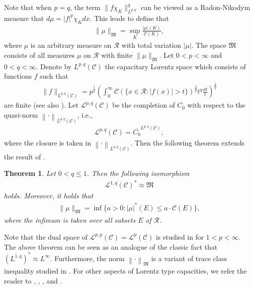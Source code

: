 \documentclass[10pt,reqno]{amsart}
\newtheorem{theorem}{Theorem}[section]
\numberwithin{equation}{section}
\begin{document}
Note that when $p=q$, the term $\|f\chi_{K}\|_{L^{p,q}}^{q}$ can be viewed as a Radon-Nikodym measure that $d\mu=|f|^{p}\chi_{K}dx$. This leads to define that
\begin{align*}
\|\mu\|_{\mathfrak{M}}=\sup_{K}\frac{|\mu|(K)}{\mathcal{C}(K)},
\end{align*}
where $\mu$ is an arbitrary measure on $\mathcal{R}$ with total variation $|\mu|$. The space $\mathfrak{M}$ consists of all measures $\mu$ on $\mathcal{R}$ with finite $\|\mu\|_{\mathfrak{M}}$. Let $0<p<\infty$ and $0<q<\infty$. Denote by $L^{p,q}(\mathcal{C})$ the capacitary Lorentz space which consists of functions $f$ such that
\begin{align*}
\|f\|_{L^{p,q}(\mathcal{C})}=p^{\frac{1}{q}}\left(\int_{0}^{\infty}\mathcal{C}(\{x\in\mathcal{R}:|f(x)|>t\})^{\frac{q}{p}}t^{q}\frac{dt}{t}\right)^{\frac{1}{q}}
\end{align*}
are finite (see also \cite{OK3}). Let $\mathcal{L}^{p,q}(\mathcal{C})$ be the completion of $C_{0}$ with respect to the quasi-norm $\left\|\cdot\right\|_{L^{p,q}(\mathcal{C})}$, i.e., 
\begin{align*}
\mathcal{L}^{p,q}(\mathcal{C})=\overline{C_{0}}^{L^{p,q}(\mathcal{C})},
\end{align*}
where the closure is taken in $\left\|\cdot\right\|_{L^{p,q}(\mathcal{C})}$. Then the following theorem extends the result of \cite[Theorem 1.3]{OK}.
\begin{theorem}\label{pre theorem}
Let $0<q\leq 1$. Then the following isomorphism
\begin{align*}
\mathcal{L}^{1,q}(\mathcal{C})^{\ast}\approx\mathfrak{M}
\end{align*}
holds. Moreover, it holds that 
\begin{align}\label{1.2}
\|\mu\|_{\mathfrak{M}}=\inf\{a>0: |\mu|^{\ast}(E)\leq a\cdot\mathcal{C}(E)\},
\end{align}
where the infimum is taken over all subsets $E$ of $\mathcal{R}$.
\end{theorem}
Note that the dual space of $\mathcal{L}^{p,p}(\mathcal{C})=\mathcal{L}^{p}(\mathcal{C})$ is studied in \cite{OK} for $1<p<\infty$. The above theorem can be seen as an analogue of the classic fact that $(L^{1,q})^{\ast}\approx L^{\infty}$. Furthermore, the norm $\left\|\cdot\right\|_{\mathfrak{M}}$ is a variant of trace class inequality studied in \cite{MV}. For other aspects of Lorentz type capacities, we refer the reader to \cite{CM}, \cite{CMS}, \cite{CMS12}, and \cite{CS}.
\end{document}
